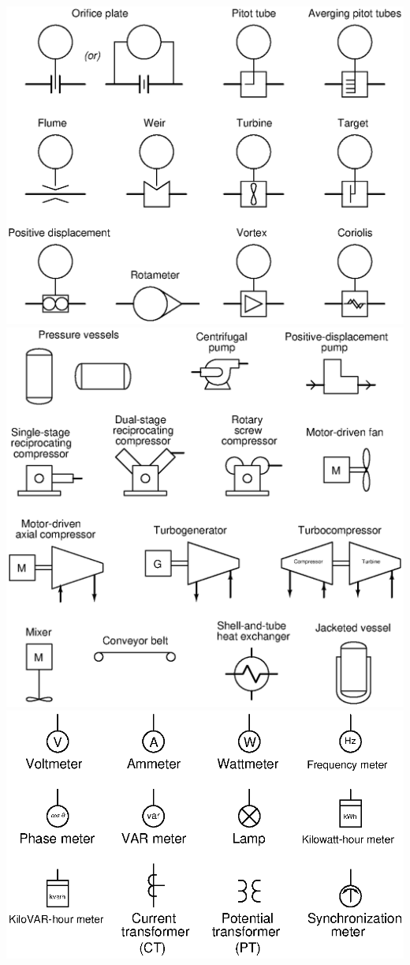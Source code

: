\documentclass[10pt,a5paper]{article}
\begin{document}
\includegraphics[width=1\textwidth]{diagrams06.eps}
\includegraphics[width=1\textwidth]{diagrams07.eps}
\includegraphics[width=1\textwidth]{diagrams10.eps}
\end{document}
